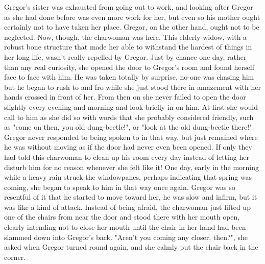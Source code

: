 \documentclass[12pt]{book}
\begin{document}
    Gregor's sister was exhausted from going out to work, and looking after Gregor as she had done before was even more work for her, but even so his mother ought certainly not to have taken her place. Gregor, on the other hand, ought not to be neglected. Now, though, the charwoman was here. This elderly widow, with a robust bone structure that made her able to withstand the hardest of things in her long life, wasn't really repelled by Gregor. Just by chance one day, rather than any real curiosity, she opened the door to Gregor's room and found herself face to face with him. He was taken totally by surprise, no-one was chasing him but he began to rush to and fro while she just stood there in amazement with her hands crossed in front of her. From then on she never failed to open the door slightly every evening and morning and look briefly in on him. At first she would call to him as she did so with words that she probably considered friendly, such as "come on then, you old dung-beetle!", or "look at the old dung-beetle there!" Gregor never responded to being spoken to in that way, but just remained where he was without moving as if the door had never even been opened. If only they had told this charwoman to clean up his room every day instead of letting her disturb him for no reason whenever she felt like it! One day, early in the morning while a heavy rain struck the windowpanes, perhaps indicating that spring was coming, she began to speak to him in that way once again. Gregor was so resentful of it that he started to move toward her, he was slow and infirm, but it was like a kind of attack. Instead of being afraid, the charwoman just lifted up one of the chairs from near the door and stood there with her mouth open, clearly intending not to close her mouth until the chair in her hand had been slammed down into Gregor's back. "Aren't you coming any closer, then?", she asked when Gregor turned round again, and she calmly put the chair back in the corner.
\end{document}
